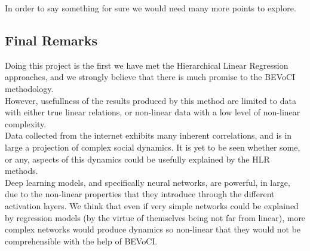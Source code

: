 \documentclass[11pt, oneside]{article}   	%
\begin{document}
In order to say something for sure we would need many more points to explore.

\subsection{Final Remarks}
Doing this project is the first we have met the Hierarchical Linear Regression approaches, and we strongly believe that there is much promise to the BEVoCI methodology.\\ 
However, usefullness of the results produced by this method are limited to data with either true linear relations, or non-linear data with a low level of non-linear complexity.\\

Data collected from the internet exhibits many inherent correlations, and is in large a projection of complex social dynamics. It is yet to be seen whether some, or any, aspects of this dynamics could be usefully explained by the HLR methods.\\

Deep learning models, and specifically neural networks, are powerful, in large, due to the non-linear properties that they introduce through the different activation layers. We think that even if very simple networks could be explained by regression models (by the virtue of themselves being not far from linear), more complex networks would produce dynamics so non-linear that they would not be comprehensible with the help of BEVoCI. 
\end{document}
